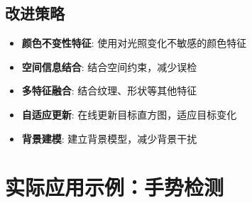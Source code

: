 \documentclass{article}
\begin{document}
\subsection{改进策略}
\begin{itemize}
    \item \textbf{颜色不变性特征}: 使用对光照变化不敏感的颜色特征
    \item \textbf{空间信息结合}: 结合空间约束，减少误检
    \item \textbf{多特征融合}: 结合纹理、形状等其他特征
    \item \textbf{自适应更新}: 在线更新目标直方图，适应目标变化
    \item \textbf{背景建模}: 建立背景模型，减少背景干扰
\end{itemize}

\section{实际应用示例：手势检测}
\end{document}
